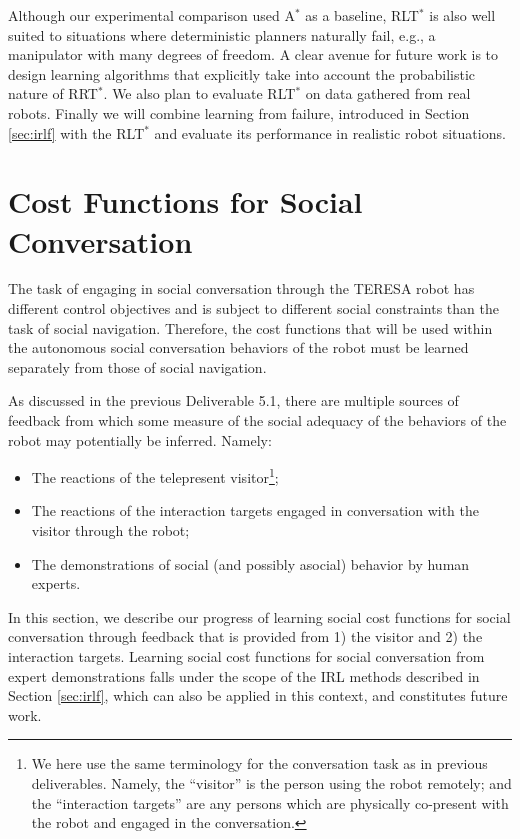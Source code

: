 \documentclass[a4paper,11pt]{report}
\begin{document}
 Although our experimental comparison used A$^*$ as a baseline, RLT$^*$ is also well suited to situations where deterministic planners naturally fail, e.g., a manipulator with many degrees of freedom. A clear avenue for future work is to design learning algorithms that explicitly take into account the probabilistic nature of RRT$^*$. We also plan to evaluate RLT$^*$ on data gathered from real robots. Finally we will combine learning from failure, introduced in Section \ref{sec:irlf} with the RLT$^*$ and evaluate its performance in realistic robot situations.

\clearpage

\section{Cost Functions for Social Conversation}
\label{sec:cost_functions}

The task of engaging in social conversation through the TERESA robot has different control objectives and is subject to different social constraints than the task of social navigation. Therefore, the cost functions that will be used within the autonomous social conversation behaviors of the robot must be learned separately from those of social navigation.

As discussed in the previous Deliverable 5.1, there are multiple sources of feedback from which some measure of the social adequacy of the behaviors of the robot may potentially be inferred. Namely:
\begin{itemize}
\item The reactions of the telepresent visitor\footnote{We here use the same terminology for the conversation task as in previous deliverables. Namely, the ``visitor'' is the person using the robot remotely; and the ``interaction targets'' are any persons which are physically co-present with the robot and engaged in the conversation.};
\item The reactions of the interaction targets engaged in conversation with the visitor through the robot;
\item The demonstrations of social (and possibly asocial) behavior by human experts. 
\end{itemize}

In this section, we describe our progress of learning social cost functions for social conversation through feedback that is provided from 1) the visitor and 2) the interaction targets. Learning social cost functions for social conversation from expert demonstrations falls under the scope of the IRL methods described in Section \ref{sec:irlf}, which can also be applied in this context, and constitutes future work.
\end{document}
